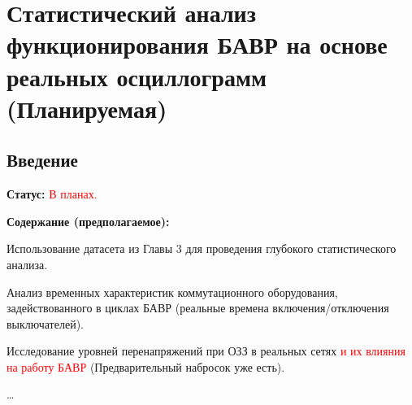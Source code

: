
\chapter{Статистический анализ функционирования БАВР на основе реальных осциллограмм (Планируемая)}
\label{ch:statistical_analysis}

\section{Введение}
\label{sec:ch04_intro}

\textbf{Статус:} \textcolor{red}{В планах.}

\textbf{Содержание (предполагаемое):}

Использование датасета из Главы 3 для проведения глубокого статистического анализа.

Анализ временных характеристик коммутационного оборудования, задействованного в циклах БАВР (реальные времена включения/отключения выключателей).

Исследование уровней перенапряжений при ОЗЗ в реальных сетях \textcolor{red}{и их влияния на работу БАВР} (Предварительный набросок уже есть).

\dots



\clearpage
